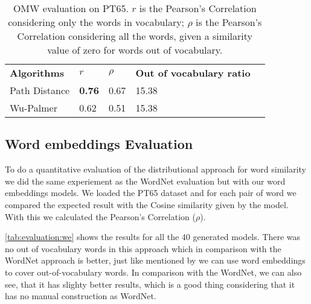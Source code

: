 \begin{table}[h]
    \caption{OMW evaluation on PT65. \textbf{$r$} is the Pearson’s Correlation considering only the words in vocabulary; \textbf{$\rho$} is the Pearson’s Correlation considering all the words, given a similarity value of zero for words out of vocabulary. }
    \label{tab:worneteval}
    \centering%
    \begin{minipage}{.6\textwidth}
    \begin{tabular}{@{}lllll@{}}
    \cmidrule(r){1-5}
    \textbf{Algorithms} & \textbf{$r$} & \textbf{$\rho$}         & \textbf{Out of vocabulary ratio} \\ 
    \cmidrule(r){1-4}
    Path Distance & \textbf{0.76} & 0.67   & 15.38                   \\
    Wu-Palmer     & 0.62    & 0.51         & 15.38                   \\ \cmidrule(r){1-4}
    \end{tabular}
    \end{minipage}
\end{table}









\subsection{Word embeddings Evaluation}\label{chap:results:we}

To do a quantitative evaluation of the distributional approach for word similarity we did the same experiement as the WordNet evaluation but with our word embeddings models.
We loaded the PT65 dataset and for each pair of word we compared the expected result with the Cosine similarity given by the model. With this we calculated the Pearson’s Correlation ($\rho$).

\autoref{tab:evaluation:we} shows the results for all the 40 generated models. There was no out of vocabulary words in this approach which in comparison with the WordNet approach is better, just like mentioned by  we can use word embeddings to cover out-of-vocabulary words. In comparison with the WordNet, we can also see, that it has slighty better results, which is a good thing considering that it has no manual construction as WordNet.

